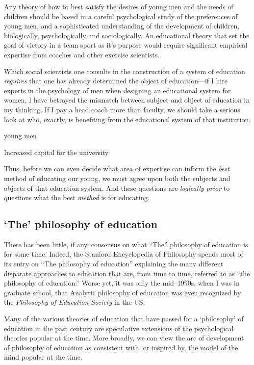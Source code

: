 Any theory of how to best satisfy the desires of young men and the needs of children should be based in a careful psychological study of the preferences of young men, and a sophisticated understanding of the development of children, biologically, psychologically and sociologically. An educational theory that set the goal of victory in a team sport as it's purpose would require significant empirical expertise from coaches and other exercise scientists. 

Which social scientists one consults in the construction of a system of education \emph{requires} that one has already determined the object of education---if I hire experts in the psychology of men when designing an educational system for women, I have betrayed the mismatch between subject and object of education in my thinking. If I pay a head coach more than faculty, we should take a serious look at who, exactly, is benefiting from the educational system of that institution.\begin{entities}young men\end{entities}\begin{objects}Increased capital for the university\end{objects}

Thus, before we can even decide what area of expertise can inform the \emph{best} method of educating our young, we must agree upon both the subjects and objects of that education system. And these questions are \emph{logically prior} to questions what the best \emph{method} is for educating.

\subsection{`The' philosophy of education}
\label{thephilosophyofeducation}

There has been little, if any, consensus on what ``The'' philosophy of education is for some time. Indeed, the Stanford Encyclopedia of Philosophy spends most of its entry on ``The philosophy of education'' explaining the many different disparate approaches to education that are, from time to time, referred to as ``the philosophy of education.'' Worse yet, it was only the mid--1990s, when I was in graduate school, that Analytic philosophy of education was even recognized by the \emph{Philosophy of Education Society} in the US. ~\citep{Phillips:2008uz}

Many of the various theories of education that have passed for a `philosophy' of education in the past century are speculative extensions of the psychological theories popular at the time. More broadly, we can view the arc of development of philosophy of education as consistent with, or inspired by, the model of the mind popular at the time. 

